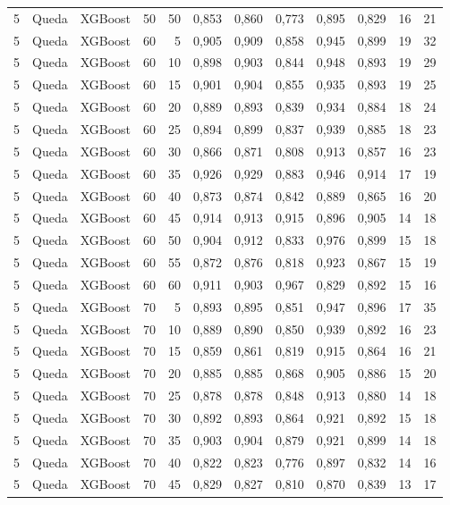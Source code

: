 \begin{longtable}{@{}rllrrrrrrrrr@{}}
5 & Queda & XGBoost & 50 & 50 & 0,853 & 0,860 & 0,773 & 0,895 & 0,829 & 16 & 21 \\
5 & Queda & XGBoost & 60 & 5 & 0,905 & 0,909 & 0,858 & 0,945 & 0,899 & 19 & 32 \\
5 & Queda & XGBoost & 60 & 10 & 0,898 & 0,903 & 0,844 & 0,948 & 0,893 & 19 & 29 \\
5 & Queda & XGBoost & 60 & 15 & 0,901 & 0,904 & 0,855 & 0,935 & 0,893 & 19 & 25 \\
5 & Queda & XGBoost & 60 & 20 & 0,889 & 0,893 & 0,839 & 0,934 & 0,884 & 18 & 24 \\
5 & Queda & XGBoost & 60 & 25 & 0,894 & 0,899 & 0,837 & 0,939 & 0,885 & 18 & 23 \\
5 & Queda & XGBoost & 60 & 30 & 0,866 & 0,871 & 0,808 & 0,913 & 0,857 & 16 & 23 \\
5 & Queda & XGBoost & 60 & 35 & 0,926 & 0,929 & 0,883 & 0,946 & 0,914 & 17 & 19 \\
5 & Queda & XGBoost & 60 & 40 & 0,873 & 0,874 & 0,842 & 0,889 & 0,865 & 16 & 20 \\
5 & Queda & XGBoost & 60 & 45 & 0,914 & 0,913 & 0,915 & 0,896 & 0,905 & 14 & 18 \\
5 & Queda & XGBoost & 60 & 50 & 0,904 & 0,912 & 0,833 & 0,976 & 0,899 & 15 & 18 \\
5 & Queda & XGBoost & 60 & 55 & 0,872 & 0,876 & 0,818 & 0,923 & 0,867 & 15 & 19 \\
5 & Queda & XGBoost & 60 & 60 & 0,911 & 0,903 & 0,967 & 0,829 & 0,892 & 15 & 16 \\
5 & Queda & XGBoost & 70 & 5 & 0,893 & 0,895 & 0,851 & 0,947 & 0,896 & 17 & 35 \\
5 & Queda & XGBoost & 70 & 10 & 0,889 & 0,890 & 0,850 & 0,939 & 0,892 & 16 & 23 \\
5 & Queda & XGBoost & 70 & 15 & 0,859 & 0,861 & 0,819 & 0,915 & 0,864 & 16 & 21 \\
5 & Queda & XGBoost & 70 & 20 & 0,885 & 0,885 & 0,868 & 0,905 & 0,886 & 15 & 20 \\
5 & Queda & XGBoost & 70 & 25 & 0,878 & 0,878 & 0,848 & 0,913 & 0,880 & 14 & 18 \\
5 & Queda & XGBoost & 70 & 30 & 0,892 & 0,893 & 0,864 & 0,921 & 0,892 & 15 & 18 \\
5 & Queda & XGBoost & 70 & 35 & 0,903 & 0,904 & 0,879 & 0,921 & 0,899 & 14 & 18 \\
5 & Queda & XGBoost & 70 & 40 & 0,822 & 0,823 & 0,776 & 0,897 & 0,832 & 14 & 16 \\
5 & Queda & XGBoost & 70 & 45 & 0,829 & 0,827 & 0,810 & 0,870 & 0,839 & 13 & 17 \\

\end{longtable}
